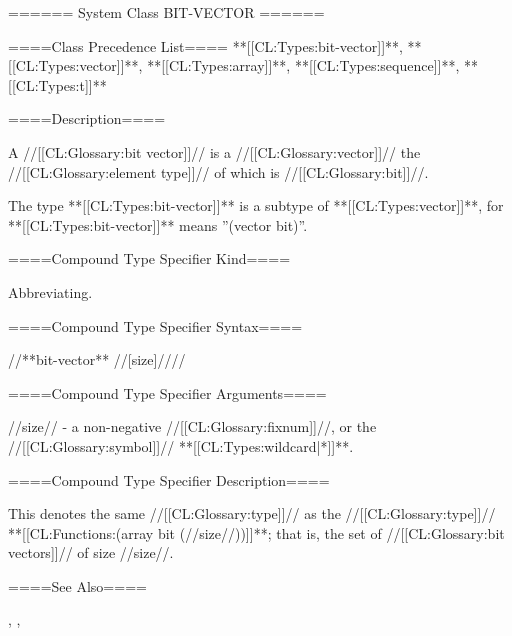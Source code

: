 ====== System Class BIT-VECTOR ======

====Class Precedence List==== **[[CL:Types:bit-vector]]**, **[[CL:Types:vector]]**, **[[CL:Types:array]]**, **[[CL:Types:sequence]]**, **[[CL:Types:t]]**

====Description====

A //[[CL:Glossary:bit vector]]// is a //[[CL:Glossary:vector]]// the //[[CL:Glossary:element type]]// of which is //[[CL:Glossary:bit]]//.

The type **[[CL:Types:bit-vector]]** is a subtype of **[[CL:Types:vector]]**, for **[[CL:Types:bit-vector]]** means ''(vector bit)''.

====Compound Type Specifier Kind====

Abbreviating.

====Compound Type Specifier Syntax====

//**bit-vector** //[size]////

====Compound Type Specifier Arguments====

//size// - a non-negative //[[CL:Glossary:fixnum]]//, or the //[[CL:Glossary:symbol]]// **[[CL:Types:wildcard|*]]**.

====Compound Type Specifier Description====

This denotes the same //[[CL:Glossary:type]]// as the //[[CL:Glossary:type]]// **[[CL:Functions:(array bit (//size//))]]**; that is, the set of //[[CL:Glossary:bit vectors]]// of size //size//.

====See Also====

{\secref\SharpsignStar}, {\secref\PrintingBitVectors}, {\secref\RequiredSpecializedArrays}

